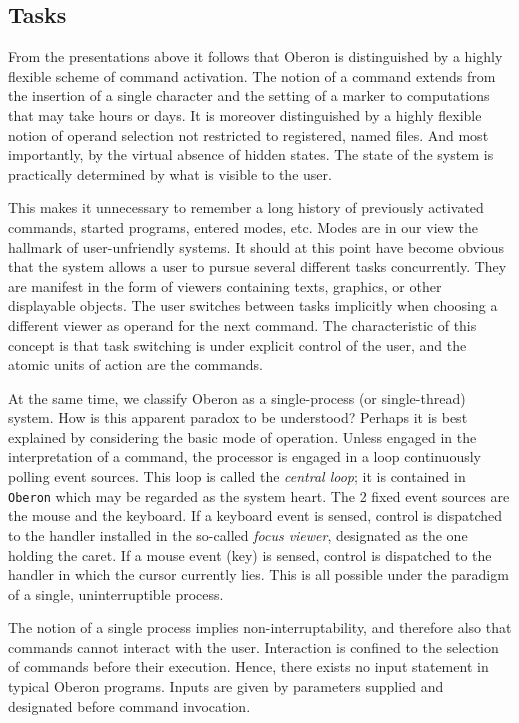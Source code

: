 \subsection{Tasks}
From the presentations above it follows that Oberon is distinguished by a highly flexible
scheme of command activation. The notion of a command extends from the insertion of a single
character and the setting of a marker to computations that may take hours or days. It is
moreover distinguished by a highly flexible notion of operand selection not restricted to
registered, named files. And most importantly, by the virtual absence of hidden states.
The state of the system is practically determined by what is visible to the user.

This makes it unnecessary to remember a long history of previously activated commands,
started programs, entered modes, etc. Modes are in our view the hallmark of user-unfriendly
systems. It should at this point have become obvious that the system allows a user to pursue
several different tasks concurrently. They are manifest in the form of viewers containing
texts, graphics, or other displayable objects. The user switches between tasks implicitly
when choosing a different viewer as operand for the next command. The characteristic of
this concept is that task switching is under explicit control of the user, and the atomic
units of action are the commands.

At the same time, we classify Oberon as a single-process (or single-thread) system. How is
this apparent paradox to be understood? Perhaps it is best explained by considering the
basic mode of operation. Unless engaged in the interpretation of a command, the processor
is engaged in a loop continuously polling event sources. This loop is called the
\emph{central loop}; it is contained in \verb|Oberon| which may be regarded as the system
heart. The 2 fixed event sources are the mouse and the keyboard. If a keyboard event is
sensed, control is dispatched to the handler installed in the so-called \emph{focus viewer},
designated as the one holding the caret. If a mouse event (key) is sensed, control is
dispatched to the handler in which the cursor currently lies. This is all possible under
the paradigm of a single, uninterruptible process.

The notion of a single process implies non-interruptability, and therefore also that commands
cannot interact with the user. Interaction is confined to the selection of commands before
their execution. Hence, there exists no input statement in typical Oberon programs. Inputs
are given by parameters supplied and designated before command invocation.

